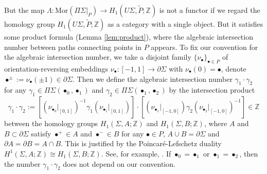 \documentclass[a4paper,12pt, twoside]{amsart}
\theoremstyle{definition}
\theoremstyle{remark}
\numberwithin{equation}{section}
\newcommand\bZ{{\mathbb{Z}}}
\newcommand\inv{^{-1}}
\newcommand\La{\Lambda}
\newcommand\Mor{\mathrm{Mor}}
\newcommand\pa{\partial}
\begin{document}
But the map $\La: \Mor(\Pi\Sigma\vert_P) \to H_1(U\Sigma, \tilde P; \bZ)$ is not a functor if we regard the homology group $H_1(U\Sigma, \tilde P; \bZ)$ as a category with a single object. 
But it satisfies some product formula (Lemma \ref{lem:product}), where the algebraic intersection number between paths connecting points in $P$ appears. 
To fix our convention for the algebraic intersection number, 
we take a disjoint family $\{\nu_\bullet\}_{\bullet \in P}$ of orientation-reversing embeddings $\nu_\bullet: [-1, 1] \to \pa\Sigma$ with $\nu_\bullet(0) = \bullet$, 
denote $\bullet^\pm := \nu_\bullet(\pm1) \in \pa\Sigma$. 
Then we define the algebraic intersection number $\gamma_1\cdot\gamma_2$ for any $\gamma_1 \in \Pi\Sigma(\bullet_0, \bullet_1)$ and $\gamma_2 \in \Pi\Sigma(\bullet_1, \bullet_2)$ by the intersection product 
$$
\gamma_1\cdot\gamma_2 := \left[\left(\nu_{\bullet_0}\vert_{[0,1]}\right)\inv\gamma_1\left(\nu_{\bullet_1}\vert_{[0,1]}\right)\right]\cdot 
 \left[\left(\nu_{\bullet_1}\vert_{[-1,0]}\right)\gamma_2\left(\nu_{\bullet_2}\vert_{[-1,0]}\right)\inv\right] \in \bZ
$$
between the homology groups $H_1(\Sigma, A; \bZ)$ and $H_1(\Sigma, B; \bZ)$, 
where $A$ and $B \subset \pa \Sigma$ satisfy $\bullet^+ \in A$ and $\bullet^- \in B$ for any $\bullet \in P$, $A\cup B = \pa\Sigma$ and $\pa A = \pa B = A\cap B$. 
This is justified by the Poincar\'e-Lefschetz duality $H^1(\Sigma, A; \bZ) \cong H_{1}(\Sigma, B; \bZ)$. See, for example, \cite[Theorem 3.43, p.254]{Hat02}. 
If $\bullet_0 = \bullet_1$ or $\bullet_1 = \bullet_2$, then the number $\gamma_1\cdot\gamma_2$ does not depend on our convention. \par
\end{document}
